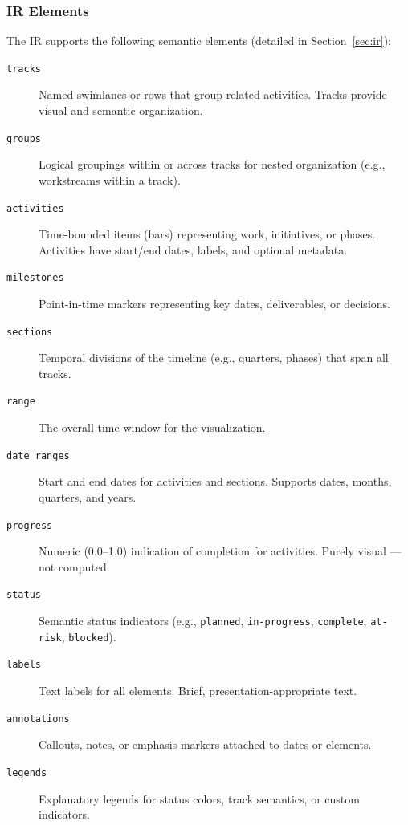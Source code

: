 \subsubsection{IR Elements}

The IR supports the following semantic elements (detailed in Section~\ref{sec:ir}):

\begin{description}
  \item[\texttt{tracks}] Named swimlanes or rows that group related activities. Tracks provide visual and semantic organization.
  
  \item[\texttt{groups}] Logical groupings within or across tracks for nested organization (e.g., workstreams within a track).
  
  \item[\texttt{activities}] Time-bounded items (bars) representing work, initiatives, or phases. Activities have start/end dates, labels, and optional metadata.
  
  \item[\texttt{milestones}] Point-in-time markers representing key dates, deliverables, or decisions.
  
  \item[\texttt{sections}] Temporal divisions of the timeline (e.g., quarters, phases) that span all tracks.
  
  \item[\texttt{range}] The overall time window for the visualization.
  
  \item[\texttt{date ranges}] Start and end dates for activities and sections. Supports dates, months, quarters, and years.
  
  \item[\texttt{progress}] Numeric (0.0–1.0) indication of completion for activities. Purely visual — not computed.
  
  \item[\texttt{status}] Semantic status indicators (e.g., \texttt{planned}, \texttt{in-progress}, \texttt{complete}, \texttt{at-risk}, \texttt{blocked}).
  
  \item[\texttt{labels}] Text labels for all elements. Brief, presentation-appropriate text.
  
  \item[\texttt{annotations}] Callouts, notes, or emphasis markers attached to dates or elements.
  
  \item[\texttt{legends}] Explanatory legends for status colors, track semantics, or custom indicators.
\end{description}

